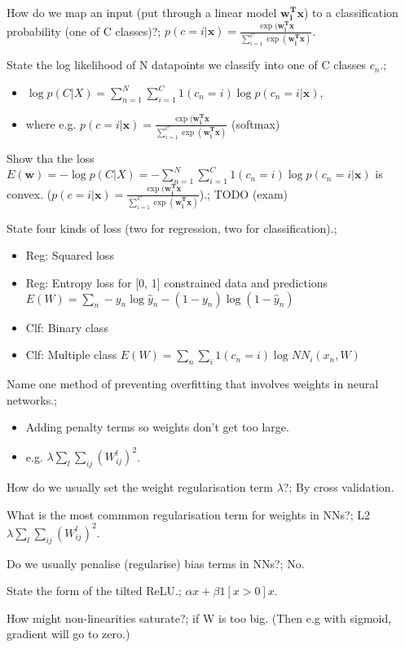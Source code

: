 \documentclass{article}
\begin{document}
How do we map an input (put through a linear model $\bm{w^T_ix}$) to a classification  probability (one of C classes)?; $p(c = i|\bm{x}) = \frac{\exp (\bm{w_i^Tx}}{\sum_{i=1}^C\exp(\bm{w^T_i x})}$.

State the log likelihood of N datapoints we classify into one of C classes $c_n$.; \begin{itemize}
    \item $\log p(C|X) = \sum_{n=1}^N \sum_{i=1}^C 1(c_n = i)\log 
    p(c_n = i|\bm{x})$, 
    \item where e.g. $p(c = i|\bm{x}) = \frac{\exp (\bm{w_i^Tx}}{\sum_{i=1}^C\exp(\bm{w^T_i x})}$ (softmax)
\end{itemize}

Show tha the loss $E(\bm{w}) = -\log p(C|X) =- \sum_{n=1}^N \sum_{i=1}^C 1(c_n = i)\log p(c_n = i|\bm{x})$ is convex. ($p(c = i|\bm{x}) = \frac{\exp (\bm{w_i^Tx}}{\sum_{i=1}^C\exp(\bm{w^T_i x})}$).; TODO (exam)

State four kinds of loss (two for regression, two for classification).; \begin{itemize}
    \item Reg: Squared loss
    \item Reg: Entropy loss for [0, 1] constrained data and predictions $E(W) = \sum_n -y_n\log \hat{y}_n - (1-y_n)\log (1-\hat{y}_n)$
    \item Clf: Binary class
    \item Clf: Multiple class $E(W) = \sum_n\sum_i 1(c_n = i)\log NN_i(x_n, W)$
\end{itemize}

Name one method of preventing overfitting that involves weights in neural networks.; \begin{itemize}
    \item Adding penalty terms so weights don't get too large.
    \item e.g. $\lambda \sum_l \sum_{ij}(W^l_{ij})^2$.
\end{itemize}

How do we usually set the weight regularisation term $\lambda$?; By cross validation.

What is the most commmon regularisation term for weights in NNs?; L2 $\lambda\sum_l\sum_{ij}(W^l_{ij})^2$.

Do we usually penalise (regularise) bias terms in NNs?; No.

State the form of the tilted ReLU.; $\alpha x + \beta 1[x > 0] x$.

How might non-linearities saturate?; if W is too big. (Then e.g with sigmoid, gradient will go to zero.)
\end{document}

